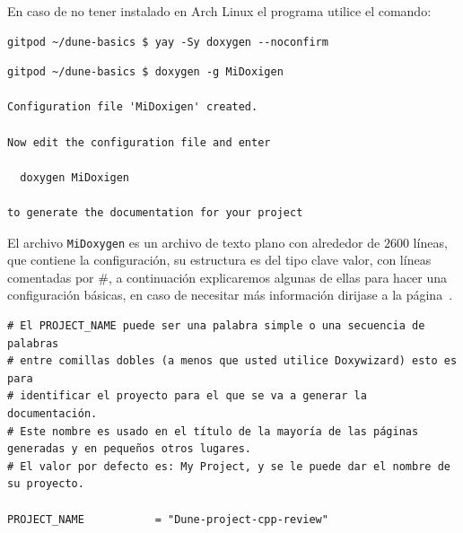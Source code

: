 \begin{frame}[fragile]\LARGE
En caso de no tener instalado en Arch Linux el programa utilice el comando:
\begin{lstlisting}
gitpod ~/dune-basics $ yay -Sy doxygen --noconfirm
\end{lstlisting}

\begin{lstlisting}
gitpod ~/dune-basics $ doxygen -g MiDoxigen

Configuration file 'MiDoxigen' created.

Now edit the configuration file and enter

  doxygen MiDoxigen

to generate the documentation for your project
\end{lstlisting}
\end{frame}

\begin{frame}
El archivo \lstinline{MiDoxygen} es un archivo de texto plano con
alrededor de $2600$ líneas, que contiene la configuración, su
estructura es del tipo clave valor, con líneas comentadas por \#, a
continuación explicaremos algunas de ellas para hacer una
configuración básicas, en caso de necesitar más información dirijase
a la página~\cite{Doxygen2021}.%
\end{frame}

\begin{frame}[fragile]\LARGE
\begin{lstlisting}
# El PROJECT_NAME puede ser una palabra simple o una secuencia de palabras 
# entre comillas dobles (a menos que usted utilice Doxywizard) esto es para 
# identificar el proyecto para el que se va a generar la documentación.
# Este nombre es usado en el título de la mayoría de las páginas generadas y en pequeños otros lugares.
# El valor por defecto es: My Project, y se le puede dar el nombre de su proyecto.

PROJECT_NAME           = "Dune-project-cpp-review"
\end{lstlisting}
\end{frame}


